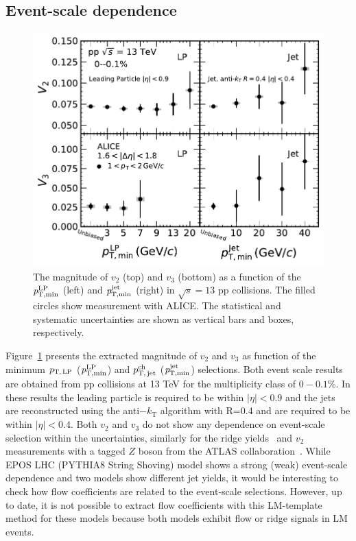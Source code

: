 \subsection{Event-scale dependence}
\begin{figure}[h!]
	\centering
	\includegraphics[width=0.6 \textwidth]{figures/Fig4_vn_LP.pdf}
	\caption{The magnitude of $v_2$ (top) and $v_3$ (bottom) as a function of the $\it{p}^{\rm{LP}}_{\rm{T,min}}$ (left) and $\it{p}^{\rm{jet}}_{\rm{T,min}}$ (right) in $\sqrt{s}=13$ pp collisions. The filled circles show measurement with ALICE. The statistical and systematic uncertainties are shown as vertical bars and boxes, respectively.}
	\label{fig:LPjet23}
\end{figure}    

Figure~\ref{fig:LPjet23} presents the extracted magnitude of $v_2$ and $v_3$ as function of the minimum $p_\mathrm{T,\,LP}$ ($\it{p}^{\rm{LP}}_{\rm{T,min}}$) and $p_\mathrm{T,\,jet}^\mathrm{ch}$ ($\it{p}^{\rm{jet}}_{\rm{T,min}}$) selections. Both event scale results are obtained from pp collisions at 13 TeV for the multiplicity class of $0-0.1\%$. In these results the leading particle is required to be within $|\eta|<0.9$ and the jets are reconstructed using the anti$-k_\mathrm{T}$ algorithm with R=0.4 and are required to be within $|\eta|<0.4$. Both $v_2$ and $v_3$ do not show any dependence on event-scale selection within the uncertainties, similarly for the ridge yields~\cite{ALICE:2021nir} and $v_{2}$ measurements  with a tagged $Z$ boson from the ATLAS collaboration~\cite{Aaboud:2019mcw}.
While  EPOS LHC (PYTHIA8 String Shoving) model shows a strong (weak)  event-scale dependence and two models show different jet yields, it would be interesting to check how flow coefficients are related to the event-scale selections. However, up to date, it is not possible to extract flow coefficients with this LM-template method for these models because both models exhibit flow or ridge signals in LM events.